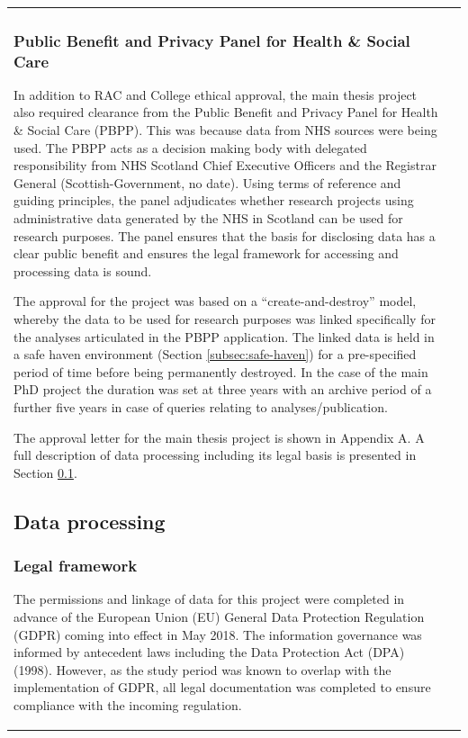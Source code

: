 \documentclass[12pt,a4paper,oneside,table]{report}
\begin{document}
\begin{tabular}[t]{ll}
\subsubsection{Public Benefit and Privacy Panel for Health \& Social Care}\label{subsec:pbpp}

In addition to RAC and College ethical approval, the main thesis project
also required clearance from the Public Benefit and Privacy Panel for
Health \& Social Care (PBPP). This was because data from NHS sources
were being used. The PBPP acts as a decision making body with delegated
responsibility from NHS Scotland Chief Executive Officers and the
Registrar General (Scottish-Government, no date). Using terms of
reference and guiding principles, the panel adjudicates whether research
projects using administrative data generated by the NHS in Scotland can
be used for research purposes. The panel ensures that the basis for
disclosing data has a clear public benefit and ensures the legal
framework for accessing and processing data is sound.

The approval for the project was based on a ``create-and-destroy''
model, whereby the data to be used for research purposes was linked
specifically for the analyses articulated in the PBPP application. The
linked data is held in a safe haven environment (Section
\ref{subsec:safe-haven}) for a pre-specified period of time before being
permanently destroyed. In the case of the main PhD project the duration
was set at three years with an archive period of a further five years in
case of queries relating to analyses/publication.

The approval letter for the main thesis project is shown in Appendix A.
A full description of data processing including its legal basis is
presented in Section \ref{subsec:dat-process}.

\subsection{Data processing}\label{subsec:dat-process}

\subsubsection{Legal framework}\label{subsec:dat-legal}

The permissions and linkage of data for this project were completed in
advance of the European Union (EU) General Data Protection Regulation
(GDPR) coming into effect in May 2018. The information governance was
informed by antecedent laws including the Data Protection Act (DPA)
(1998). However, as the study period was known to overlap with the
implementation of GDPR, all legal documentation was completed to ensure
compliance with the incoming regulation.


\end{tabular}
\end{document}
